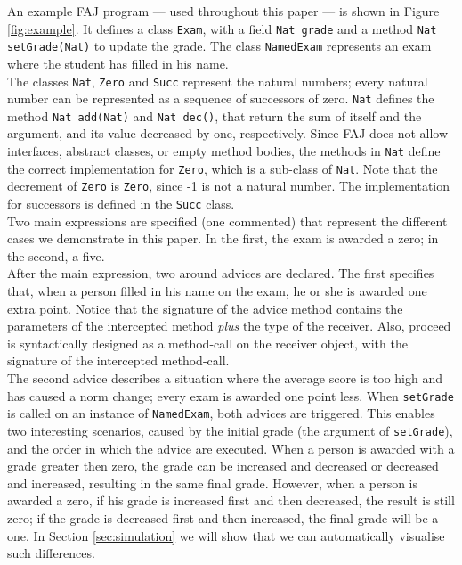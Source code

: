 An example FAJ program --- used throughout this paper --- is shown in Figure \ref{fig:example}. It defines a class {\tt Exam}, with a field {\tt Nat grade} and a method {\tt Nat setGrade(Nat)} to update the grade. The class {\tt NamedExam} represents an exam where the student has filled in his name.\\
The classes {\tt Nat}, {\tt Zero} and {\tt Succ} represent the natural numbers; every natural number can be represented as a sequence of successors of zero. {\tt Nat} defines the method {\tt Nat add(Nat)} and {\tt Nat dec()}, that return the sum of itself and the argument, and its value decreased by one, respectively. Since FAJ does not allow interfaces, abstract classes, or empty method bodies, the methods in {\tt Nat} define the correct implementation for {\tt Zero}, which is a sub-class of {\tt Nat}. Note that the decrement of {\tt Zero} is {\tt Zero}, since -1 is not a natural number. The implementation for successors is defined in the {\tt Succ} class.\\
Two main expressions are specified (one commented) that represent the different cases we demonstrate in this paper. In the first, the exam is awarded a zero; in the second, a five.\\
After the main expression, two around advices are declared. The first specifies that, when a person filled in his name on the exam, he or she is awarded one extra point. Notice that the signature of the advice method contains the parameters of the intercepted method \emph{plus} the type of the receiver. Also, proceed is syntactically designed as a method-call on the receiver object, with the signature of the intercepted method-call.\\
The second advice describes a situation where the average score is too high and has caused a norm change; every exam is awarded one point less. When {\tt setGrade} is called on an instance of {\tt NamedExam}, both advices are triggered. This enables two interesting scenarios, caused by the initial grade (the argument of {\tt setGrade}), and the order in which the advice are executed. When a person is awarded with a grade greater then zero, the grade can be increased and decreased or decreased and increased, resulting in the same final grade. However, when a person is awarded a zero, if his grade is increased first and then decreased, the result is still zero; if the grade is decreased first and then increased, the final grade will be a one. In Section \ref{sec:simulation} we will show that we can automatically visualise such differences.


